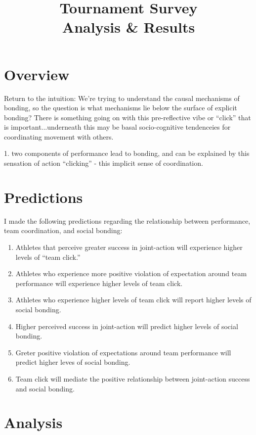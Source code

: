 \documentclass[12pt]{report}
\title{
{Tournament Survey}\\
{Analysis & Results}
}
\begin{document}
\maketitle{}

\section{Overview}

Return to the intuition:
We're trying to understand the causal mechanisms of bonding, so the question is what mechanisms lie below the surface of explicit bonding? There is something going on with this pre-reflective vibe or ``click'' that is important...underneath this may be basal socio-cognitive tendenceies for coordinating movement with others.

1. two components of performance lead to bonding, and can be explained by this sensation of action ``clicking'' - this implicit sense of coordination.


\section{Predictions}

I made the following predictions regarding the relationship between performance, team coordination, and social bonding:

\begin{enumerate}
  \item Athletes that perceive greater success in joint-action will experience higher levels of ``team click.''
  \item Athletes who experience more positive violation of expectation around team performance will experience higher levels of team click.
  \item Athletes who experience higher levels of team click will report higher levels of social bonding.
  \item Higher perceived success in joint-action will predict higher levels of social bonding.
  \item Greter positive violation of expectations around team performance will predict higher leves of social bonding.
  \item Team click will mediate the positive relationship between joint-action success and social bonding.
\end{enumerate}


\section{Analysis}
\end{document}
